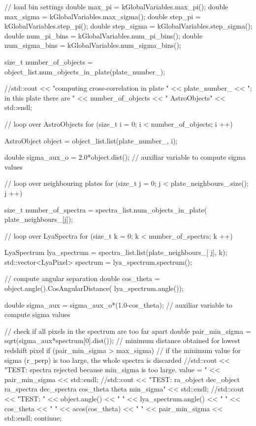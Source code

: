 \begin{DoxyCode}
                                                                               
                                                                                      
          {
    // load bin settings
    double max_pi = kGlobalVariables.max_pi();
    double max_sigma = kGlobalVariables.max_sigma();
    double step_pi = kGlobalVariables.step_pi();
    double step_sigma = kGlobalVariables.step_sigma();
    double num_pi_bins = kGlobalVariables.num_pi_bins();
    double num_sigma_bins = kGlobalVariables.num_sigma_bins();    
    
    size_t number_of_objects = object_list.num_objects_in_plate(plate_number_);
    
    //std::cout << "computing cross-correlation in plate " << plate_number_ <<
       "; in this plate there are " << number_of_objects << " AstroObjects" <<
       std::endl;

    // loop over AstroObjects
    for (size_t i = 0; i < number_of_objects; i ++){
        AstroObject object = object_list.list(plate_number_, i);
                
        double sigma_aux_o = 2.0*object.dist(); // auxiliar variable to compute
       sigma values
        
        // loop over neighbouring plates
        for (size_t j = 0; j < plate_neighbours_.size(); j ++){
            
            size_t number_of_spectra = spectra_list.num_objects_in_plate(
      plate_neighbours_[j]);
            
            // loop over LyaSpectra
            for (size_t k = 0; k < number_of_spectra; k ++){

                LyaSpectrum lya_spectrum = spectra_list.list(plate_neighbours_[
      j], k);
                std::vector<LyaPixel> spectrum = lya_spectrum.spectrum();
                
                // compute angular separation
                double cos_theta = object.angle().CosAngularDistance(
      lya_spectrum.angle());
                
                double sigma_aux = sigma_aux_o*(1.0-cos_theta); // auxiliar
       variable to compute sigma values
                
                // check if all pixels in the spectrum are too far apart
                double pair_min_sigma = sqrt(sigma_aux*spectrum[0].dist()); //
       minimum distance obtained for lowest redshift pixel
                if (pair_min_sigma > max_sigma){ // if the minimum value for
       sigma (r_perp) is too large, the whole spectra is discarded
                    //std::cout << "TEST: spectra rejected because min_sigma is
       too large. value = " << pair_min_sigma << std::endl;
                    //std::cout << "TEST: ra_object dec_object ra_spectra
       dec_spectra cos_theta theta min_sigma" << std::endl;
                    //std::cout << "TEST: " << object.angle() << " " <<
       lya_spectrum.angle() << " " << cos_theta << " " << acos(cos_theta) << " " <<
       pair_min_sigma << std::endl;
                    continue;
                } 
                
}}}}
\end{DoxyCode}
